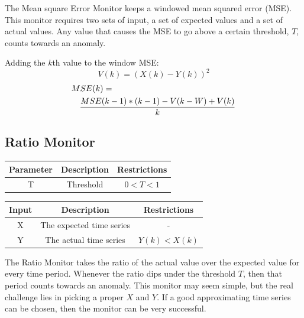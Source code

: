 \documentclass[12pt]{ucthesis}
\begin{document}
The Mean square Error Monitor keeps a windowed mean squared error (MSE). This monitor requires two sets of input, a set
of expected values and a set of actual values. Any value that causes the MSE to go above a certain threshold, $T$,
counts towards an anomaly.

Adding the $k$th value to the window MSE:
$$
   V(k) = (X(k) - Y(k))^{2}
$$
\begin{eqnarray*}
   \lefteqn{MSE(k) = }\\
   && \frac{MSE(k - 1) * (k - 1) - V(k - W) + V(k)}{k}
\end{eqnarray*}

\subsection{Ratio Monitor}
\label{outage-detection-monitors-Ratio}
\begin{table}[H]
   \begin{center}
      \begin{tabular}{|c|c|c|}
         \hline
            Parameter & Description & Restrictions \\
         \hline
            T & Threshold & $ 0 < T < 1 $\\
         \hline
      \end{tabular}
   \end{center}
\end{table}

\begin{table}[H]
   \begin{center}
      \begin{tabular}{|c|c|c|}
         \hline
            Input & Description & Restrictions \\
         \hline
            X & The expected time series & - \\
         \hline
            Y & The actual time series & $ Y(k) < X(k) $\\
         \hline
      \end{tabular}
   \end{center}
\end{table}

The Ratio Monitor takes the ratio of the actual value over the expected value for every time period.
Whenever the ratio dips under the threshold $T$, then that period counts towards an anomaly.
This monitor may seem simple, but the real challenge lies in picking a proper $X$ and $Y$.
If a good approximating time series can be chosen, then the monitor can be very successful.
\end{document}
